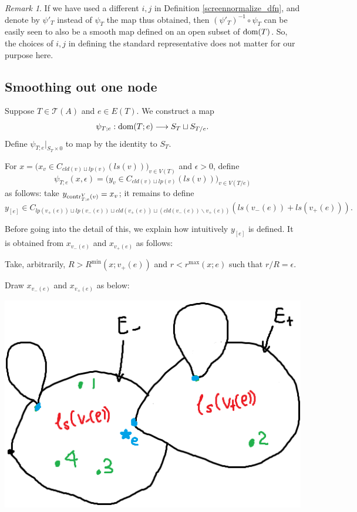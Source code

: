 \documentclass[11pt]{article}
\theoremstyle{definition}
\theoremstyle{remark}
\newtheorem{rmk}[thm]{Remark}
\def\cT{\mathcal{T}}
\def\dom{{\tn{dom}}}
\def\tn#1{\textnormal{#1}}
\begin{document}
\begin{rmk}
If we have used a different $i,j$ in Definition \ref{screennormalize_dfn}, and denote by $\psi'_T$ instead of $\psi_T$ the map thus obtained, then $(\psi'_T)^{-1}\circ\psi_T$ can be easily seen to also be a smooth map defined on an open subset of $\dom(T)$. So, the choices of $i,j$ in defining the standard representative does not matter for our purpose here. 
\end{rmk}




\subsection{Smoothing out one node}

Suppose $T\in\cT(A)$ and $e\in E(T)$. 
We construct a map 
$$\psi_{T;e}: \dom(T;e)\longrightarrow S_T\sqcup S_{T/e}.$$
Define $\psi_{T;e}|_{S_T\times 0}$ to map by the identity to $S_T$. 

For $x=\big(x_v\in C_{cld(v)\sqcup lp(v)}(ls(v))\big)_{v\in V(T)}$ and $\epsilon>0$, define 
$$\psi_{T;e}(x,\epsilon)=\big(y_v\in C_{cld(v)\sqcup lp(v)}(ls(v))\big)_{v\in V(T/e)}$$ 
as follows: 
take $y_{\tn{contr}^V_{T;e}(v)}=x_v$; it remains to define $$y_{[e]}\in C_{lp(v_+(e))\sqcup lp(v_-(e))\sqcup cld(v_+(e))\sqcup (cld(v_-(e))\backslash v_+(e))}(ls(v_-(e))+ls(v_+(e))).$$

Before going into the detail of this, we explain how intuitively $y_{[e]}$ is defined. It is obtained from $x_{v_-(e)}$ and $x_{v_+(e)}$ as follows: 

Take, arbitrarily, $R>R^{\min}(x;v_+(e))$ and $r<r^{\max}(x;e)$ such that $r/R=\epsilon$. 

Draw $x_{v_-(e)}$ and $x_{v_+(e)}$ as below: 

\includegraphics[scale=0.5]{yedfn1_fig}
\end{document}
